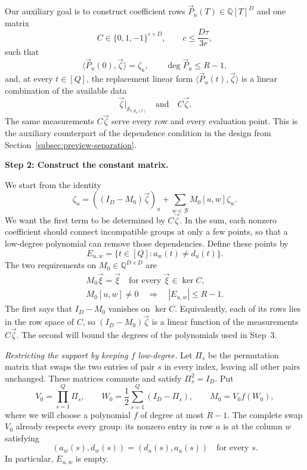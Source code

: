 \documentclass[11pt,reqno]{amsart}
\numberwithin{equation}{section}
\theoremstyle{definition}\newtheorem{definition}[theorem]{Definition}
\theoremstyle{remark}\newtheorem{remark}[theorem]{Remark}
\renewcommand{\le}{\leqslant}
\begin{document}
Our auxiliary goal is to construct coefficient rows
$\vec P_u(T)\in\mathbb Q[T]^D$ and one matrix
\[
 C\in\{0,1,-1\}^{c\times D},\qquad c\le\frac{D\tau}{3r},
\]
such that
\[
 \langle\vec P_u(0),\vec\zeta\rangle=\zeta_u,
 \qquad \deg\vec P_u\le R-1,
\]
and, at every $t\in[Q]$, the replacement linear form
$\langle\vec P_u(t),\vec\zeta\rangle$ is a linear combination
of the available data
\begin{equation}\label{eq:overview-auxiliary-requirement}
 \vec\zeta|_{\mathcal S_{t,d_u(t)}}\quad\text{and}\quad C\vec\zeta.
\end{equation}
The same measurements $C\vec\zeta$ serve every row and every
evaluation point. This is the auxiliary counterpart of the
dependence condition in the design from
Section~\ref{subsec:preview-separation}.

\medskip\noindent
\textbf{Step 2: Construct the constant matrix.}\par\nobreak
\smallskip\noindent
We start from the identity
\[
 \zeta_u=((I_D-M_0)\vec\zeta)_u+
                   \sum_{w\in\mathcal B}M_0[u,w]\zeta_w.
\]
We want the first term to be determined by $C\vec\zeta$.
In the sum, each nonzero coefficient should connect incompatible
groups at only a few points, so that a low-degree polynomial
can remove those dependencies. Define these points by
\[
 E_{u,w}=\{t\in[Q]:a_w(t)\ne d_u(t)\}.
\]
The two requirements on $M_0\in\mathbb Q^{D\times D}$ are
\begin{equation}\label{eq:outline-matrix-conditions}
 \begin{gathered}
 M_0\vec\xi=\vec\xi\quad\text{for every }\vec\xi\in\ker C,\\
 M_0[u,w]\ne0\quad\Longrightarrow\quad |E_{u,w}|\le R-1.
 \end{gathered}
\end{equation}
The first says that $I_D-M_0$ vanishes on $\ker C$. Equivalently,
each of its rows lies in the row space of $C$, so
$(I_D-M_0)\vec\zeta$ is a linear function of the measurements
$C\vec\zeta$. The second will bound the degrees of the polynomials
used in Step~3.

\smallskip\noindent
\emph{Restricting the support by keeping $f$ low-degree.}
Let $\Pi_s$ be the permutation matrix that
swaps the two entries of pair $s$ in every index, leaving all
other pairs unchanged. These matrices commute and satisfy
$\Pi_s^2=I_D$. Put
\[
 V_0=\prod_{s=1}^Q\Pi_s,\qquad
 W_0=\frac12\sum_{s=1}^Q(I_D-\Pi_s),\qquad
 M_0=V_0f(W_0),
\]
where we will choose a polynomial $f$ of degree at most $R-1$.
The complete swap $V_0$ already respects every group: its
nonzero entry in row $u$ is at the column $w$ satisfying
\[
 (a_w(s),d_w(s))=(d_u(s),a_u(s))\quad\text{for every }s.
\]
In particular, $E_{u,w}$ is empty.
\end{document}
